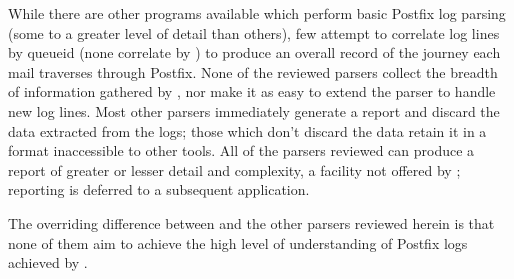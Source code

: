 While there are other programs available which perform basic Postfix log
parsing (some to a greater level of detail than others), few attempt to
correlate log lines by queueid (none correlate by \pid{}) to produce an
overall record of the journey each mail traverses through Postfix.  None of
the reviewed parsers collect the breadth of information gathered by
\parsername{}, nor make it as easy to extend the parser to handle new log
lines.  Most other parsers immediately generate a report and discard the
data extracted from the logs; those which don't discard the data retain it
in a format inaccessible to other tools.  All of the parsers reviewed can
produce a report of greater or lesser detail and complexity, a facility not
offered by \parsername{}; reporting is deferred to a subsequent
application.

The overriding difference between \parsername{} and the other parsers
reviewed herein is that none of them aim to achieve the high level of
understanding of Postfix logs achieved by \parsername{}.
